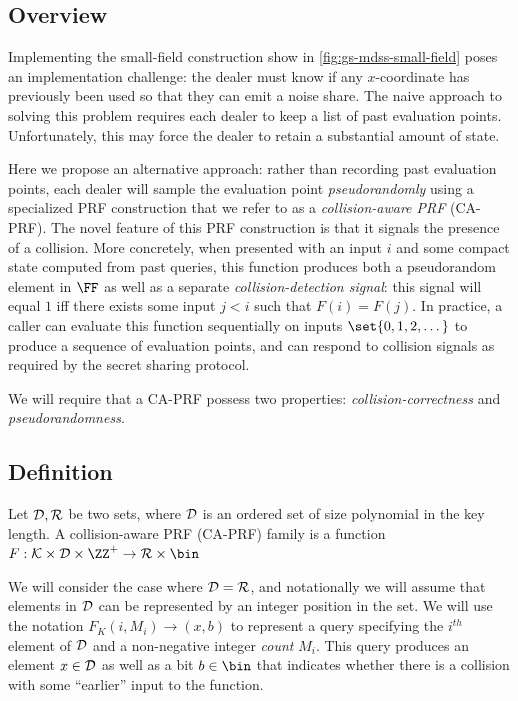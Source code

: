 \subsection{Overview}
Implementing the small-field construction show in \cref{fig:gs-mdss-small-field} poses an implementation challenge: the dealer must know if any $x$-coordinate has previously been used so that they can emit a noise share.
The naive approach to solving this problem requires each dealer to keep a list of past evaluation points.
Unfortunately, this may force the dealer to retain a substantial amount of state.

Here we propose an alternative approach: rather than recording past evaluation points, each dealer will sample the evaluation point {\em pseudorandomly} using a specialized PRF construction that we refer to as a {\em collision-aware PRF} (CA-PRF).
The novel feature of this PRF construction is that it signals the presence of a collision.
More concretely, when presented with an input $i$ and some compact state computed from past queries, this function produces both a pseudorandom element in $\FF$ as well as a separate {\em collision-detection signal}: this signal will equal $1$ iff there exists some input $j < i$ such that $F(i) = F(j)$.
In practice, a caller can evaluate this function sequentially on inputs $\set{0, 1, 2, \dots}$ to produce a sequence of evaluation points, and can respond to collision signals as required by the secret sharing protocol.

We will require that a CA-PRF possess two properties: \emph{collision-correctness} and \emph{pseudorandomness}.

\subsection{Definition}

\begin{definition}[CA-PRF]
	Let $\mathcal{D}, \mathcal{R}$ be two sets, where $\mathcal{D}$ is an ordered set of size polynomial in the key length.
	A collision-aware PRF (CA-PRF) family is a function $F: \keyspace \times \domain \times \ZZ^{+} \rightarrow \range \times \bin$
\end{definition}

We will consider the case where $\mathcal{D} = \mathcal{R}$, and notationally we will assume that elements in $\mathcal{D}$ can be represented by an integer position in the set.
We will use the notation $F_K(i, M_i) \rightarrow (x, b)$ to represent a query specifying the $i^{th}$ element of $\mathcal{D}$ and a non-negative integer {\em count} $M_i$.
This query produces an element $x \in \mathcal{D}$ as well as a bit $b \in \bin$ that indicates whether there is a collision with some ``earlier'' input to the function.


